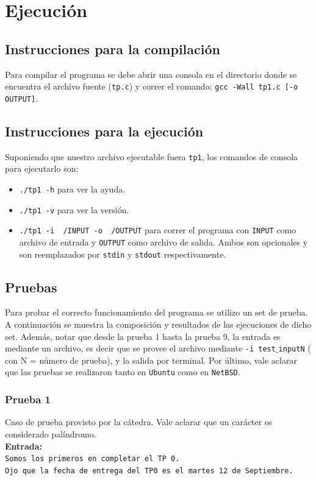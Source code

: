 \documentclass[a4paper, 10pt]{article}
\def\code#1{\texttt{#1}}
\newcommand\tab[1][0.5cm]{\hspace*{#1}}
\begin{document}
	\section{Ejecución}
		\subsection{Instrucciones para la compilación}
			Para compilar el programa se debe abrir una consola en el directorio donde se encuentra el archivo
			fuente (\code{tp.c}) y correr el comando: \code{gcc -Wall tp1.c [-o OUTPUT]}.
		\subsection{Instrucciones para la ejecución}
			Suponiendo que nuestro archivo ejecutable fuera \code{tp1}, los comandos de consola para ejecutarlo
			son:
			\begin{itemize}
				\item \code{./tp1 -h} para ver la ayuda.
				\item \code{./tp1 -v} para ver la versión.
				\item \code{./tp1 -i ~/INPUT -o ~/OUTPUT}  para correr el programa con \code{INPUT} como archivo de entrada
				y \code{OUTPUT} como archivo de salida. Ambos son opcionales y son reemplazados por \code{stdin} y \code{stdout}
				respectivamente.
			\end{itemize}
		\subsection{Pruebas}
			Para probar el correcto funcionamiento del programa se utilizo un set de prueba. A continuación
			se muestra la composición y resultados de las ejecuciones de dicho set. Además, notar que
      desde la prueba 1 hasta la prueba 9, la entrada es mediante un archivo, es decir que
      se provee el archivo mediante \code{-i test$\_$inputN} ( con N = número de prueba), y la salida
      por terminal. Por último, vale aclarar que las pruebas se realizaron tanto en \code{Ubuntu}
      como en \code{NetBSD}.

      \subsubsection{Prueba 1}
        Caso de prueba provisto por la cátedra. Vale aclarar que un carácter es considerado
        palíndromo.\\

				\textbf{Entrada:}\\
				\tab\tab\code{Somos los primeros en completar el TP 0.}\\
				\tab\tab\code{Ojo que la fecha de entrega del TP0 es el martes 12 de Septiembre.}\\
\end{document}
